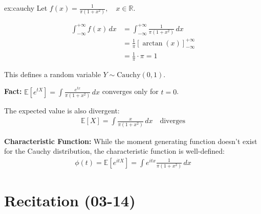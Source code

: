         \begin{example}{ex:cauchy}
            Let $f(x) = \frac{1}{\pi(1+x^2)}, \quad x \in \mathbb{R}$.
            
            \begin{align*}
            \int_{-\infty}^{+\infty} f(x) \, dx &= \int_{-\infty}^{+\infty} \frac{1}{\pi(1+x^2)} \, dx \\
            &= \frac{1}{\pi} \left[ \arctan(x) \right]_{-\infty}^{+\infty} \\
            &= \frac{1}{\pi} \cdot \pi = 1
            \end{align*}
            
            This defines a random variable $Y \sim \text{Cauchy}(0,1)$.
            
            \textbf{Fact:} $\mathbb{E}[e^{tX}] = \int \frac{e^{tx}}{\pi(1+x^2)} \, dx$ converges only for $t = 0$.
            
            The expected value is also divergent:
            \begin{align*}
            \mathbb{E}[X] = \int \frac{x}{\pi(1+x^2)} \, dx \quad \text{diverges}
            \end{align*}
            
            \textbf{Characteristic Function:} While the moment generating function doesn't exist for the Cauchy distribution, the characteristic function is well-defined:
            \begin{align*}
            \phi(t) = \mathbb{E}[e^{itX}] = \int e^{itx} \frac{1}{\pi(1+x^2)} \, dx
            \end{align*}
            \end{example}
\section{Recitation (03-14)}
